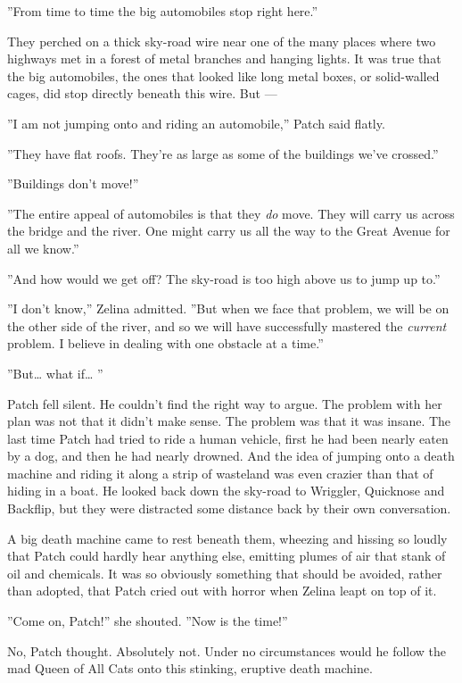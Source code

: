 \documentclass[12pt]{book}
\begin{document}
''From time to time the big automobiles stop right here.''

They perched on a thick sky-road wire near one of the many places
where two highways met in a forest of metal branches and hanging
lights. It was true that the big automobiles, the ones that looked
like long metal boxes, or solid-walled cages, did stop directly
beneath this wire. But ---

''I am not jumping onto and riding an automobile,'' Patch said flatly.

''They have flat roofs. They're as large as some of the buildings
we've crossed.''

''Buildings don't move!''

''The entire appeal of automobiles is that they \textit{do} move. They
will carry us across the bridge and the river. One might carry us all
the way to the Great Avenue for all we know.''

''And how would we get off? The sky-road is too high above us to jump
up to.''

''I don't know,'' Zelina admitted. ''But when we face that problem, we
will be on the other side of the river, and so we will have
successfully mastered the \textit{current} problem. I believe in
dealing with one obstacle at a time.''

''But\ldots{} what if\ldots{} ''

Patch fell silent. He couldn't find the right way to argue. The
problem with her plan was not that it didn't make sense. The problem
was that it was insane. The last time Patch had tried to ride a human
vehicle, first he had been nearly eaten by a dog, and then he had
nearly drowned. And the idea of jumping onto a death machine and
riding it along a strip of wasteland was even crazier than that of
hiding in a boat. He looked back down the sky-road to Wriggler,
Quicknose and Backflip, but they were distracted some distance back by
their own conversation.

A big death machine came to rest beneath them, wheezing and hissing so
loudly that Patch could hardly hear anything else, emitting plumes of
air that stank of oil and chemicals. It was so obviously something
that should be avoided, rather than adopted, that Patch cried out with
horror when Zelina leapt on top of it.

''Come on, Patch!'' she shouted. ''Now is the time!''

No, Patch thought. Absolutely not. Under no circumstances would he
follow the mad Queen of All Cats onto this stinking, eruptive death
machine.
\end{document}
